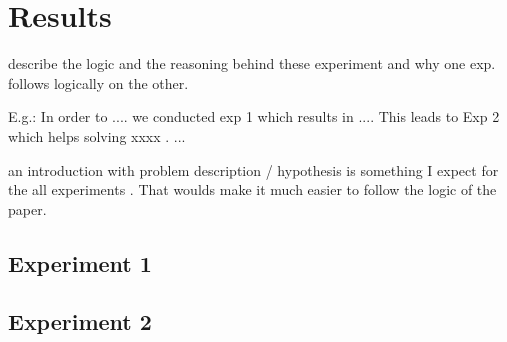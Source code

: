 \section*{Results}

describe the logic and the reasoning behind these experiment and why one exp. follows logically on the other. 

E.g.: In order to .... we conducted exp 1 which results in .... This leads to Exp  2 which helps solving xxxx . ... 


an introduction  with problem description / hypothesis is something I expect for the all experiments . That woulds make it much easier to follow the logic of the paper.


\subsection*{Experiment 1}
\subsection*{Experiment 2}










